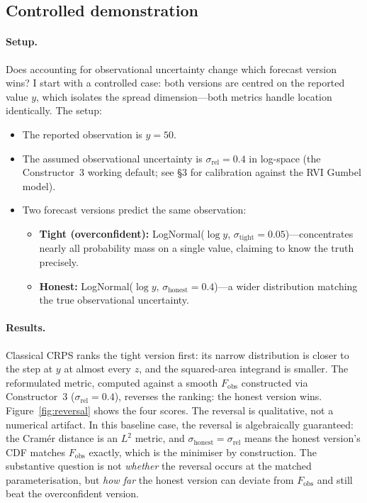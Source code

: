 \subsection{Controlled demonstration}

\paragraph{Setup.}
Does accounting for observational uncertainty change which forecast version wins? I start with a controlled case: both versions are centred on the reported value $y$, which isolates the spread dimension---both metrics handle location identically. The setup:

\begin{itemize}
    \item The reported observation is $y = 50$.
    \item The assumed observational uncertainty is $\sigma_\text{rel} = 0.4$ in log-space (the Constructor~3 working default; see \S3 for calibration against the RVI Gumbel model).
    \item Two forecast versions predict the same observation:
    \begin{itemize}
        \item \textbf{Tight (overconfident):} LogNormal($\log y$, $\sigma_\text{tight} = 0.05$)---concentrates nearly all probability mass on a single value, claiming to know the truth precisely.
        \item \textbf{Honest:} LogNormal($\log y$, $\sigma_\text{honest} = 0.4$)---a wider distribution matching the true observational uncertainty.
    \end{itemize}
\end{itemize}

\paragraph{Results.}
Classical CRPS ranks the tight version first: its narrow distribution is closer to the step at $y$ at almost every $z$, and the squared-area integrand is smaller. The reformulated metric, computed against a smooth $F_\text{obs}$ constructed via Constructor~3 ($\sigma_\text{rel} = 0.4$), reverses the ranking: the honest version wins. Figure~\ref{fig:reversal} shows the four scores. The reversal is qualitative, not a numerical artifact. In this baseline case, the reversal is algebraically guaranteed: the Cram\'er distance is an $L^2$ metric, and $\sigma_\text{honest} = \sigma_\text{rel}$ means the honest version's CDF matches $F_\text{obs}$ exactly, which is the minimiser by construction. The substantive question is not \emph{whether} the reversal occurs at the matched parameterisation, but \emph{how far} the honest version can deviate from $F_\text{obs}$ and still beat the overconfident version.

